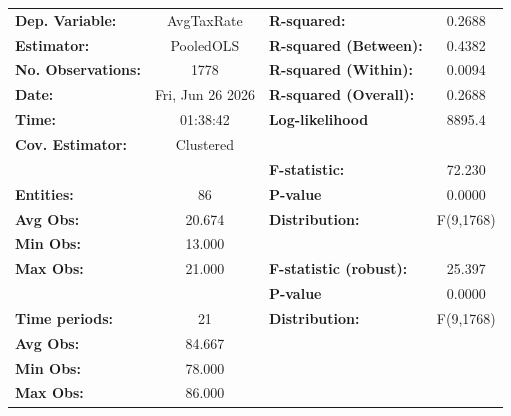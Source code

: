 \begin{center}
\begin{tabular}{lclc}
\toprule
\textbf{Dep. Variable:}                       &     AvgTaxRate     & \textbf{  R-squared:         }   &      0.2688      \\
\textbf{Estimator:}                           &     PooledOLS      & \textbf{  R-squared (Between):}  &      0.4382      \\
\textbf{No. Observations:}                    &        1778        & \textbf{  R-squared (Within):}   &      0.0094      \\
\textbf{Date:}                                &  Fri, Jun 26 2026  & \textbf{  R-squared (Overall):}  &      0.2688      \\
\textbf{Time:}                                &      01:38:42      & \textbf{  Log-likelihood     }   &      8895.4      \\
\textbf{Cov. Estimator:}                      &     Clustered      & \textbf{                     }   &                  \\
\textbf{}                                     &                    & \textbf{  F-statistic:       }   &      72.230      \\
\textbf{Entities:}                            &         86         & \textbf{  P-value            }   &      0.0000      \\
\textbf{Avg Obs:}                             &       20.674       & \textbf{  Distribution:      }   &    F(9,1768)     \\
\textbf{Min Obs:}                             &       13.000       & \textbf{                     }   &                  \\
\textbf{Max Obs:}                             &       21.000       & \textbf{  F-statistic (robust):} &      25.397      \\
\textbf{}                                     &                    & \textbf{  P-value            }   &      0.0000      \\
\textbf{Time periods:}                        &         21         & \textbf{  Distribution:      }   &    F(9,1768)     \\
\textbf{Avg Obs:}                             &       84.667       & \textbf{                     }   &                  \\
\textbf{Min Obs:}                             &       78.000       & \textbf{                     }   &                  \\
\textbf{Max Obs:}                             &       86.000       & \textbf{                     }   &                  \\

\end{tabular}
\end{center}
